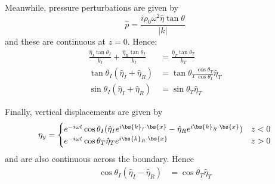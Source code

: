 \documentclass{article}
\begin{document}
Meanwhile, pressure perturbations are given by
\begin{equation}
    \hat{p}=\frac{i\rho_0\omega^2\hat\eta\tan\theta}{|k|}
\end{equation}
and these are continuous at $z=0$. Hence:
\begin{align}
    \frac{\hat\eta_I\tan\theta_I}{k_I} + \frac{\hat\eta_R\tan\theta_I}{k_I} 
     &= \frac{\hat\eta_T\tan\theta_T}{k_T} \\
    \tan\theta_I(\hat\eta_I+\hat\eta_R)
     &=\tan\theta_T\frac{\cos\theta_T}{\cos\theta_I} \hat\eta_T \\
    \sin\theta_I (\hat\eta_I + \hat\eta_R) &= 
    \sin\theta_T \hat\eta_T  
    \label{q4:eqn1}
\end{align}

Finally, vertical displacements are given by
\begin{equation}
    \eta_y = \begin{cases}
        e^{-i\omega t} \cos\theta_I (\hat\eta_I e^{i\bs{k}_I\cdot\bs{x}} -
                                     \hat\eta_R e^{i\bs{k}_R\cdot\bs{x}}) & z < 0 \\
        e^{-i\omega t} \cos\theta_T \hat\eta_T e^{i\bs{k}_R\cdot\bs{x}} & z > 0
    \end{cases}
\end{equation}
and are also continuous across the boundary. Hence
\begin{align}
    \cos\theta_I (\hat\eta_I - \hat\eta_R) &= \cos\theta_T \hat\eta_T \\
    \label{q4:eqn2}
\end{align}
\end{document}
